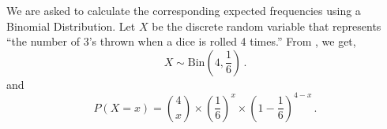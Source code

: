 %
%


\begin{subquestions}
	
\subquestion

We are asked to calculate the corresponding expected frequencies using a Binomial Distribution. Let $X$ be the discrete random variable that represents ``the number of 3's thrown when a dice is rolled 4 times.'' From , we get,
\begin{equation}
	X \sim \text{Bin}\left(4, \frac{1}{6}\right) \,.
\end{equation}
and 
\begin{equation}
	P(X = x) = { 4 \choose x} \times \left(\frac{1}{6} \right)^x \times \left(1-\frac{1}{6} \right)^{4-x} \,.
\end{equation}
	

\end{subquestions}
